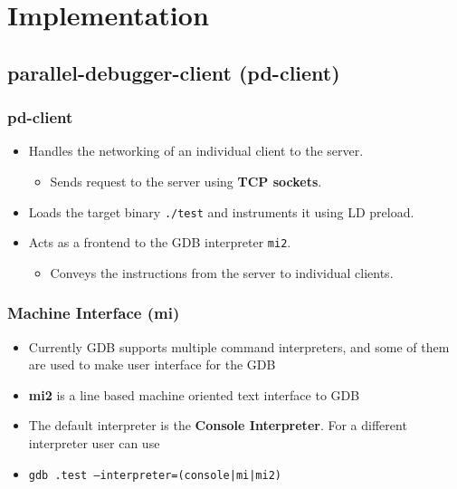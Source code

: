 \documentclass{beamer}
\begin{document}
\section{Implementation}
\subsection{parallel-debugger-client (pd-client)}

\begin{frame}
  \frametitle{pd-client}
  \begin{itemize}
  \item <1-> Handles the networking of an individual client to the server.
    \begin{itemize}
      \item <2-> Sends request to the server using \textbf{TCP sockets}.
    \end{itemize}
    \item  <3-> Loads the target binary \texttt{./test} and instruments it using
    LD preload.
  \item <4-> Acts as a frontend to the GDB interpreter \texttt{mi2}.
    \begin{itemize}
    \item <5-> Conveys the instructions from the server to individual clients.
    \end{itemize}
  \end{itemize}
\end{frame}

\begin{frame}
  \frametitle{Machine Interface (mi)}
  \begin{itemize}
  \item <1-> {Currently GDB supports multiple command interpreters, and
      some of them are used to make user interface for the GDB}
  \item <2-> {\textbf{mi2} is a line based machine oriented text interface to
    GDB}
\item <3-> {The default interpreter is the \textbf{Console Interpreter}. For
   a different interpreter user can use}
\item <3-> {\texttt{gdb .test --interpreter=(console|mi|mi2)}}
\end{itemize}
\end{frame}
\end{document}
